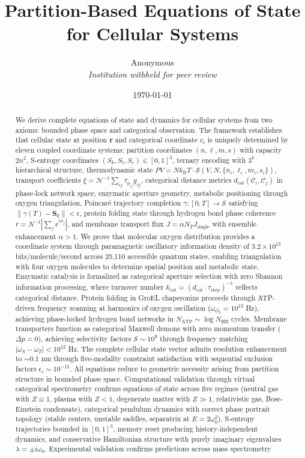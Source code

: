 \documentclass[12pt,a4paper]{article}
\title{\textbf{Partition-Based Equations of State for Cellular Systems}}
\author{
Anonymous\\
\textit{Institution withheld for peer review}
}
\date{\today}
\theoremstyle{plain}
\theoremstyle{definition}
\theoremstyle{remark}
\newcommand{\kB}{k_{\mathrm{B}}}
\newcommand{\Sspace}{\mathcal{S}}
\newcommand{\Sk}{S_k}
\newcommand{\St}{S_t}
\newcommand{\Se}{S_e}
\newcommand{\Scoord}{\mathbf{S}}
\newcommand{\dcat}{d_{\mathrm{cat}}}
\newcommand{\taulag}{\tau_{\mathrm{p}}}
\begin{document}
\maketitle

\begin{abstract}
We derive complete equations of state and dynamics for cellular systems from two axioms: bounded phase space and categorical observation. The framework establishes that cellular state at position $\mathbf{r}$ and categorical coordinate $c_t$ is uniquely determined by eleven coupled coordinate systems: partition coordinates $(n,\ell,m,s)$ with capacity $2n^2$, S-entropy coordinates $(\Sk,\St,\Se) \in [0,1]^3$, ternary encoding with $3^k$ hierarchical structure, thermodynamic state $PV = N\kB T \cdot \mathcal{S}(V,N,\{n_i,\ell_i,m_i,s_i\})$, transport coefficients $\xi = \mathcal{N}^{-1} \sum_{ij} \taulag_{ij} g_{ij}$, categorical distance metrics $\dcat(\mathcal{C}_i,\mathcal{C}_j)$ in phase-lock network space, enzymatic aperture geometry, metabolic positioning through oxygen triangulation, Poincaré trajectory completion $\gamma: [0,T] \to \Sspace$ satisfying $\|\gamma(T) - \Scoord_0\| < \epsilon$, protein folding state through hydrogen bond phase coherence $r = N^{-1}|\sum_j e^{i\phi_j}|$, and membrane transport flux $J = \alpha N_T J_{\text{single}}$ with ensemble enhancement $\alpha > 1$. We prove that molecular oxygen distribution provides a coordinate system through paramagnetic oscillatory information density of $3.2 \times 10^{15}$ bits/molecule/second across 25,110 accessible quantum states, enabling triangulation with four oxygen molecules to determine spatial position and metabolic state. Enzymatic catalysis is formalized as categorical aperture selection with zero Shannon information processing, where turnover number $k_{\text{cat}} = (\dcat \cdot \tau_{\text{step}})^{-1}$ reflects categorical distance. Protein folding in GroEL chaperonins proceeds through ATP-driven frequency scanning at harmonics of oxygen oscillation ($\omega_{O_2} = 10^{13}$ Hz), achieving phase-locked hydrogen bond networks in $N_{\text{ATP}} \sim \log N_{\text{HB}}$ cycles. Membrane transporters function as categorical Maxwell demons with zero momentum transfer ($\Delta p = 0$), achieving selectivity factors $\mathcal{S} \sim 10^9$ through frequency matching $|\omega_S - \omega_T| < 10^{12}$ Hz. The complete cellular state vector admits resolution enhancement to $\sim 0.1$ nm through five-modality constraint satisfaction with sequential exclusion factors $\epsilon_i \sim 10^{-15}$. All equations reduce to geometric necessity arising from partition structure in bounded phase space. Computational validation through virtual categorical spectrometry confirms equations of state across five regimes (neutral gas with $Z \equiv 1$, plasma with $Z < 1$, degenerate matter with $Z \gg 1$, relativistic gas, Bose-Einstein condensate), categorical pendulum dynamics with correct phase portrait topology (stable centers, unstable saddles, separatrix at $E = 2\omega_0^2$), S-entropy trajectories bounded in $[0,1]^3$, memory reset producing history-independent dynamics, and conservative Hamiltonian structure with purely imaginary eigenvalues $\lambda = \pm i\omega_0$. Experimental validation confirms predictions across mass spectrometry 
\end{abstract}
\end{document}
